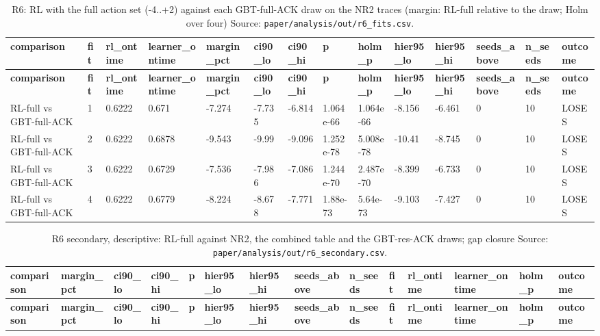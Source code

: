 \documentclass[10pt]{article}
\begin{document}
\begin{landscape}
\setlength{\tabcolsep}{2pt}
\begin{longtable}{@{}llllllllllllll@{}}
\caption{R6: RL with the full action set (-4..+2) against each GBT-full-ACK draw on the NR2 traces (margin: RL-full relative to the draw; Holm over four) Source: \texttt{paper/analysis/out/r6\_fits.csv}.}\\
\toprule
\textbf{comparison} & \textbf{fit} & \textbf{rl\_ontime} & \textbf{learner\_ontime} & \textbf{margin\_pct} & \textbf{ci90\_lo} & \textbf{ci90\_hi} & \textbf{p} & \textbf{holm\_p} & \textbf{hier95\_lo} & \textbf{hier95\_hi} & \textbf{seeds\_above} & \textbf{n\_seeds} & \textbf{outcome} \\
\midrule
\endfirsthead
\toprule
\textbf{comparison} & \textbf{fit} & \textbf{rl\_ontime} & \textbf{learner\_ontime} & \textbf{margin\_pct} & \textbf{ci90\_lo} & \textbf{ci90\_hi} & \textbf{p} & \textbf{holm\_p} & \textbf{hier95\_lo} & \textbf{hier95\_hi} & \textbf{seeds\_above} & \textbf{n\_seeds} & \textbf{outcome} \\
\midrule
\endhead
RL-full vs GBT-full-ACK & 1 & 0.6222 & 0.671 & -7.274 & -7.735 & -6.814 & 1.064e-66 & 1.064e-66 & -8.156 & -6.461 & 0 & 10 & LOSES \\
RL-full vs GBT-full-ACK & 2 & 0.6222 & 0.6878 & -9.543 & -9.99 & -9.096 & 1.252e-78 & 5.008e-78 & -10.41 & -8.745 & 0 & 10 & LOSES \\
RL-full vs GBT-full-ACK & 3 & 0.6222 & 0.6729 & -7.536 & -7.986 & -7.086 & 1.244e-70 & 2.487e-70 & -8.399 & -6.733 & 0 & 10 & LOSES \\
RL-full vs GBT-full-ACK & 4 & 0.6222 & 0.6779 & -8.224 & -8.678 & -7.771 & 1.88e-73 & 5.64e-73 & -9.103 & -7.427 & 0 & 10 & LOSES \\
\bottomrule
\end{longtable}
\normalsize
\tiny
\setlength{\tabcolsep}{2pt}
\begin{longtable}{@{}llllllllllllll@{}}
\caption{R6 secondary, descriptive: RL-full against NR2, the combined table and the GBT-res-ACK draws; gap closure Source: \texttt{paper/analysis/out/r6\_secondary.csv}.}\\
\toprule
\textbf{comparison} & \textbf{margin\_pct} & \textbf{ci90\_lo} & \textbf{ci90\_hi} & \textbf{p} & \textbf{hier95\_lo} & \textbf{hier95\_hi} & \textbf{seeds\_above} & \textbf{n\_seeds} & \textbf{fit} & \textbf{rl\_ontime} & \textbf{learner\_ontime} & \textbf{holm\_p} & \textbf{outcome} \\
\midrule
\endfirsthead
\toprule
\textbf{comparison} & \textbf{margin\_pct} & \textbf{ci90\_lo} & \textbf{ci90\_hi} & \textbf{p} & \textbf{hier95\_lo} & \textbf{hier95\_hi} & \textbf{seeds\_above} & \textbf{n\_seeds} & \textbf{fit} & \textbf{rl\_ontime} & \textbf{learner\_ontime} & \textbf{holm\_p} & \textbf{outcome} \\

\end{longtable}
\end{landscape}
\end{document}
